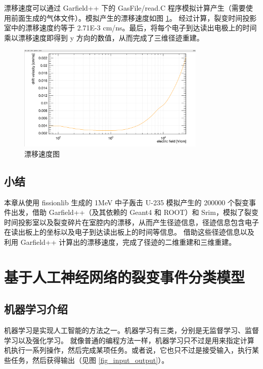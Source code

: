 \documentclass[AutoFakeBold]{LZUThesis}
\begin{document}
漂移速度可以通过 Garfield++ 下的 GasFile/read.C 程序模拟计算产生（需要使用前面生成的气体文件）。模拟产生的漂移速度如图 \ref{fig_drift_velocity}。
经过计算，裂变时间投影室中的漂移速度约等于 2.71E-3 cm/ns。最后，将每个电子到达读出电极上的时间乘以漂移速度即得到 y 方向的数值，从而完成了三维径迹重建。

\begin{figure}[H]
    \centering
    \includegraphics[width=0.8\textwidth]{figures/drift_velocity.png}
    \caption{漂移速度图}
    \label{fig_drift_velocity}
\end{figure}



\section{小结}
本章从使用 fissionlib 生成的 1MeV 中子轰击 U-235 模拟产生的 200000 个裂变事件出发，借助 Garfield++（及其依赖的 Geant4 和 ROOT）和 Srim，模拟了裂变时间投影室以及裂变碎片在室腔内的漂移，从而产生径迹信息，径迹信息包含电子在读出板上的坐标以及电子到达读出板上的时间等信息。
借助这些径迹信息以及利用 Garfield++ 计算出的漂移速度，完成了径迹的二维重建和三维重建。













\chapter{基于人工神经网络的裂变事件分类模型}
\section{机器学习介绍}
机器学习是实现人工智能的方法之一。机器学习有三类，分别是无监督学习、监督学习以及强化学习。
就像普通的编程方法一样，机器学习只不过是用来指定计算机执行一系列操作，然后完成某项任务。或者说，它也只不过是接受输入，执行某些任务，然后获得输出（见图 \ref{fig_input_output}）。
\end{document}

